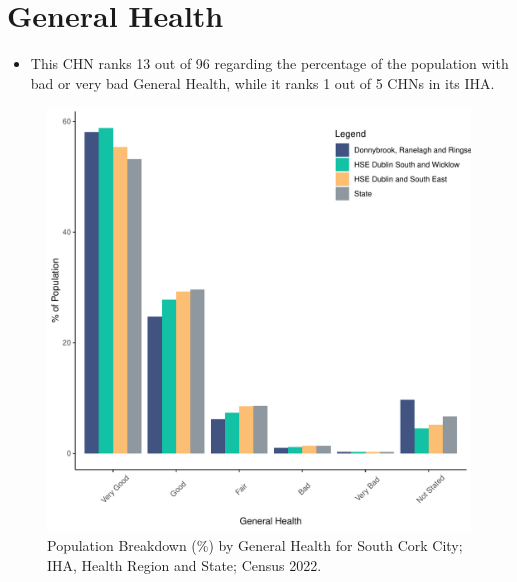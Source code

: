 \documentclass{article}
\begin{document}
\pagebreak

\section{General Health}\label{sect:GenHealth}
\begin{itemize}
\item  This CHN ranks  13 out of 96 regarding the percentage of the population with bad or very bad General Health, while it ranks   1 out of 5 CHNs in its IHA.
\end{itemize}
\begin{figure}[h]
	\centering
	\includegraphics[width = 150mm]{../figures/GenED.pdf}
	\caption{Population Breakdown (\%) by General Health for South Cork City; IHA, Health Region and State;  Census 2022.}
	\label{fig:2ae19629-1a6a-13a3-e055-000000000001}
	\end{figure}
\end{document}
